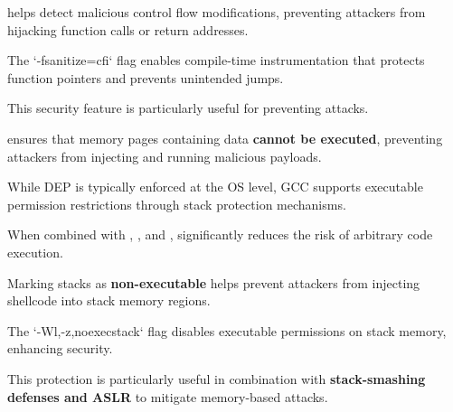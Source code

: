 \begin{NxSSSSBox}
	\begin{NxIDBox}
		 helps detect malicious control flow modifications, preventing attackers from hijacking function calls or return addresses.
	\end{NxIDBox}
	\begin{NxIDBox}
		The `-fsanitize=cfi` flag enables compile-time instrumentation that protects function pointers and prevents unintended jumps.
	\end{NxIDBox}
	\begin{NxIDBox}
		This security feature is particularly useful for preventing  attacks.
	\end{NxIDBox}
\end{NxSSSSBox}

\begin{NxSSSSBox}
	\begin{NxIDBox}
		 ensures that memory pages containing data \textbf{cannot be executed}, preventing attackers from injecting and running malicious payloads.
	\end{NxIDBox}
	\begin{NxIDBox}
		While DEP is typically enforced at the OS level, GCC supports executable permission restrictions through stack protection mechanisms.
	\end{NxIDBox}
	\begin{NxIDBox}
		When combined with , , and ,  significantly reduces the risk of arbitrary code execution.
	\end{NxIDBox}
\end{NxSSSSBox}

\begin{NxSSSSBox}
	\begin{NxIDBox}
		Marking stacks as \textbf{non-executable} helps prevent attackers from injecting shellcode into stack memory regions.
	\end{NxIDBox}
	\begin{NxIDBox}
		The `-Wl,-z,noexecstack` flag disables executable permissions on stack memory, enhancing security.
	\end{NxIDBox}
	\begin{NxIDBox}
		This protection is particularly useful in combination with \textbf{stack-smashing defenses and ASLR} to mitigate memory-based attacks.
	\end{NxIDBox}
\end{NxSSSSBox}

